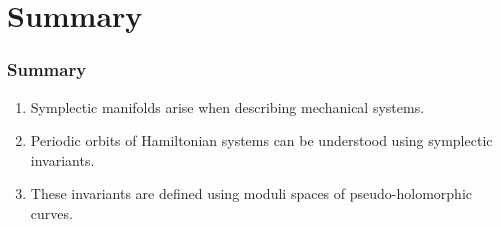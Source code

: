 \section{Summary}
\begin{frame}
  \frametitle{Summary}
  \begin{enumerate}
    \item Symplectic manifolds arise when describing mechanical systems.
    \item Periodic orbits of Hamiltonian systems can be understood using symplectic invariants.
    \item These invariants are defined using moduli spaces of pseudo-holomorphic curves.
  \end{enumerate}
  \pause
  \vspace{2\baselineskip}{\LARGE Thanks for listening! Any questions?}
\end{frame}

